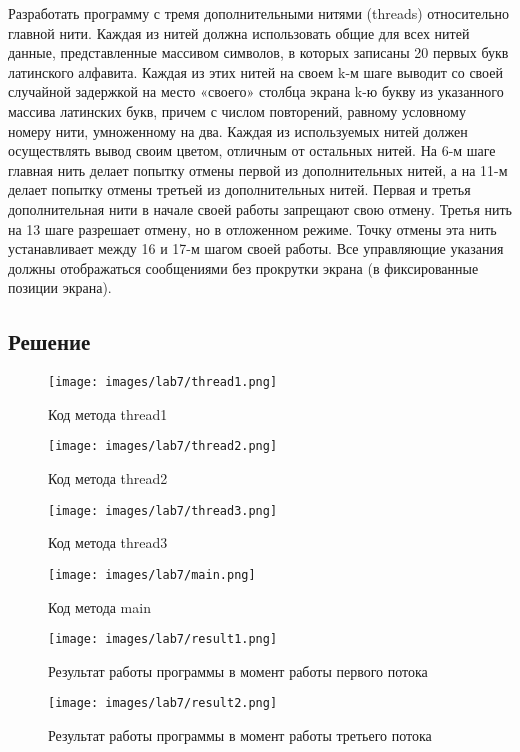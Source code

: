     Разработать программу с тремя дополнительными нитями (threads) относительно главной нити. Каждая из нитей должна использовать общие для всех нитей данные, представленные массивом символов, в которых записаны 20 первых букв латинского алфавита. Каждая из этих нитей на своем k-м шаге выводит со своей случайной задержкой на место «своего» столбца экрана k-ю букву из указанного массива латинских букв, причем с числом повторений, равному условному номеру нити, умноженному на два. Каждая из используемых нитей должен осуществлять вывод своим цветом, отличным от остальных нитей. На 6-м шаге главная нить делает попытку отмены первой из дополнительных нитей, а на 11-м делает попытку отмены третьей из дополнительных нитей. Первая и третья дополнительная нити в начале своей работы запрещают свою отмену. Третья нить на 13 шаге разрешает отмену, но в отложенном режиме. Точку отмены эта нить устанавливает между 16 и 17-м шагом своей работы. Все управляющие указания должны отображаться сообщениями без прокрутки экрана (в фиксированные позиции экрана).

    \subsection*{Решение}

    \begin{figure}[H]
        \centering
        \texttt{[image: images/lab7/thread1.png]}
        \caption{Код метода thread1}
    \end{figure}

    \begin{figure}[H]
        \centering
        \texttt{[image: images/lab7/thread2.png]}
        \caption{Код метода thread2}
    \end{figure}

    \begin{figure}[H]
        \centering
        \texttt{[image: images/lab7/thread3.png]}
        \caption{Код метода thread3}
    \end{figure}

    \begin{figure}[H]
        \centering
        \texttt{[image: images/lab7/main.png]}
        \caption{Код метода main}
    \end{figure}

    \begin{figure}[H]
        \centering
        \texttt{[image: images/lab7/result1.png]}
        \caption{Результат работы программы в момент работы первого потока}
    \end{figure}

    \begin{figure}[H]
        \centering
        \texttt{[image: images/lab7/result2.png]}
        \caption{Результат работы программы в момент работы третьего потока}
    \end{figure}

    \newpage
    

